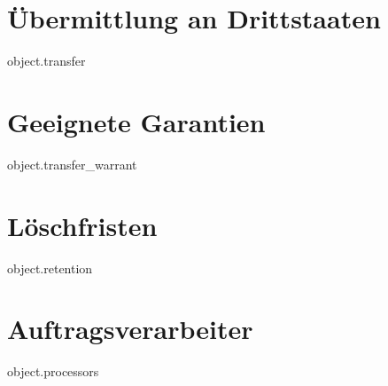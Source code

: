 \documentclass[DIV14, 11pt, DIN, a4paper]{scrartcl}
\begin{document}
  \section{Übermittlung an Drittstaaten}
  {{ object.transfer }}

  \section{Geeignete Garantien}
  {{ object.transfer_warrant }}

  \section{Löschfristen}
  {{ object.retention }}

  \section{Auftragsverarbeiter}
  {{ object.processors }}
\end{document}
